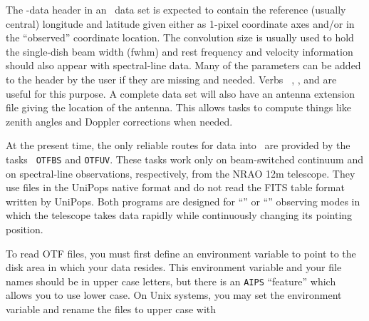      The \uv-data header in an \AIPS\ data set is expected to contain
the reference (usually central) longitude and latitude given either as
1-pixel coordinate axes and/or in the ``observed'' coordinate location.
The convolution size is usually used to hold the single-dish beam
width (fwhm) and rest frequency and velocity information should also
appear with spectral-line data.  Many of the parameters can be added
to the header by the user if they are missing and needed.  Verbs {\tt
{}}, {\tt {}}, and {\tt {}} are
useful for this purpose.  A complete data set will also have an
antenna extension file giving the location of the antenna.  This
allows tasks to compute things like zenith angles and Doppler
corrections when needed.


     At the present time, the only reliable routes for
 data into \AIPS\ are provided by the tasks {\tt
OTFBS} and \hbox{{\tt OTFUV}}.  These tasks work only on beam-switched
continuum and on spectral-line observations, respectively, from the
NRAO 12m telescope.  They use files in the UniPops native format and
do not read the FITS table format written by UniPops.  Both programs
are designed for ``'' or ``'' observing
modes in which the telescope takes data rapidly while continuously
changing its pointing position.


     To read OTF files, you must first define an environment variable
to point to the disk area in which your data resides.  This
environment variable and your file names should be in upper case
letters, but there is an {\tt AIPS} ``feature'' which allows you to
use lower case.  On Unix systems, you may set the environment variable
and rename the files to upper case with


